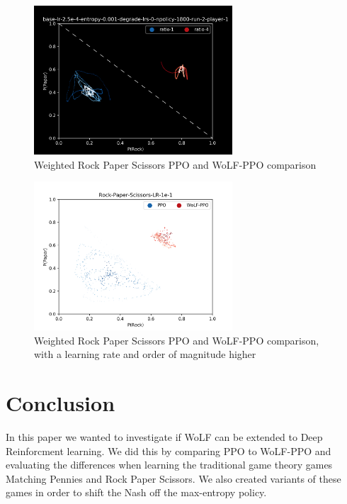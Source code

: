 \documentclass[conference]{IEEEtran}
\begin{document}
\begin{figure}
    \centering
    \includegraphics[width=20em]{Figures/weighted-rps-ppo-e4.png}
    \caption{Weighted Rock Paper Scissors PPO and WoLF-PPO comparison}
    \label{fig:weighted-rps-ppo-e4}
\end{figure}

\begin{figure}
    \centering
    \includegraphics[width=20em]{Figures/rock-paper-scissors-lr-1e-1}
    \caption{Weighted Rock Paper Scissors PPO and WoLF-PPO comparison, with a learning rate and order of magnitude higher}
    \label{fig:weighted-rps-ppo-e1}
\end{figure}

\section{Conclusion}


In this paper we wanted to investigate if WoLF can be extended to Deep Reinforcment learning. We did this by comparing PPO to WoLF-PPO and evaluating the differences when learning the traditional game theory games Matching Pennies and Rock Paper Scissors. We also created variants of these games in order to shift the Nash off the max-entropy policy.
\end{document}
